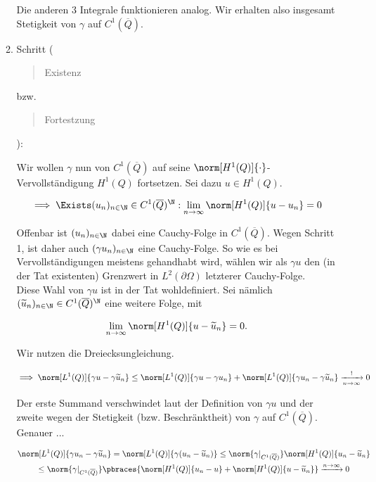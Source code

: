 \begin{solution}
\begin{enumerate}[label = \textbf{\alph*)}]
\begin{enumerate}[label = \arabic*.]
    Die anderen $3$ Integrale funktionieren analog.
    Wir erhalten also insgesamt Stetigkeit von $\gamma$ auf $C^1(\overline{Q})$.

    \item Schritt (\blockquote{Existenz} bzw. \blockquote{Fortestzung}):

    Wir wollen $\gamma$ nun von $C^1(\overline{Q})$ auf seine $\norm[H^1(Q)]{\cdot}$-Vervollständigung $H^1(Q)$ fortsetzen.
    Sei dazu $u \in H^1(Q)$.

    \begin{align*}
      \implies
      \Exists (u_n)_{n \in \N} \in C^1(\overline{Q})^\N:
      \lim_{n \to \infty}
      \norm[H^1(Q)]{u - u_n}
      =
      0
    \end{align*}

    Offenbar ist $(u_n)_{n \in \N}$ dabei eine Cauchy-Folge in $C^1(\overline{Q})$.
    Wegen Schritt 1, ist daher auch $(\gamma u_n)_{n \in \N}$ eine Cauchy-Folge.
    So wie es bei Vervollständigungen meistens gehandhabt wird, wählen wir als $\gamma u$ den
    (in der Tat existenten) Grenzwert in $L^2(\partial \Omega)$ letzterer Cauchy-Folge. \\

    Diese Wahl von $\gamma u$ ist in der Tat wohldefiniert.
    Sei nämlich $(\widetilde{u}_n)_{n \in \N} \in C^1(\overline{Q})^\N$ eine weitere Folge, mit

    \begin{align*}
      \lim_{n \to \infty}
      \norm[H^1(Q)]{u - \widetilde{u}_n}
      =
      0.
    \end{align*}

    Wir nutzen die Dreiecksungleichung.

    \begin{align*}
      \implies
      \norm[L^1(Q)]{\gamma u - \gamma \widetilde{u}_n}
      \leq
      \norm[L^1(Q)]{\gamma u - \gamma u_n}
      +
      \norm[L^1(Q)]{\gamma u_n - \gamma \widetilde{u}_n}
      \xrightarrow[n \to \infty]{!}
      0
    \end{align*}

    Der erste Summand verschwindet laut der Definition von $\gamma u$ und der zweite wegen der Stetigkeit (bzw. Beschränktheit) von $\gamma$ auf $C^1(\overline{Q})$.
    Genauer ...

    \begin{multline*}
      \norm[L^1(Q)]{\gamma u_n - \gamma \widetilde{u}_n}
      =
      \norm[L^1(Q)]{\gamma (u_n - \widetilde{u}_n)}
      \leq
      \norm{\gamma|_{C^1(\overline{Q})}}
      \norm[H^1(Q)]{u_n - \widetilde{u}_n} \\
      \leq
      \norm{\gamma|_{C^1(\overline{Q})}}
      \pbraces
      {
        \norm[H^1(Q)]{u_n - u}
        +
        \norm[H^1(Q)]{u - \widetilde{u}_n}
      }
      \xrightarrow[]{n \to \infty}
      0
    \end{multline*}


\end{enumerate}
\end{enumerate}
\end{solution}
